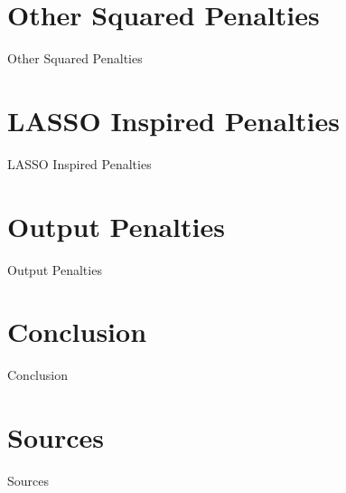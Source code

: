 \documentclass{beamer}
\begin{document}
\section{Other Squared Penalties}

\begin{frame}{Other Squared Penalties}
	
\end{frame}

\section{LASSO Inspired Penalties}

\begin{frame}{LASSO Inspired Penalties}
	
\end{frame}

\section{Output Penalties}

\begin{frame}{Output Penalties}
	
\end{frame}

\section{Conclusion}

\begin{frame}{Conclusion}
	
\end{frame}

\section*{Sources}

\begin{frame}{Sources}
	
\end{frame}
\end{document}
